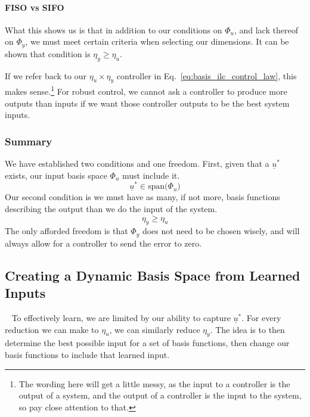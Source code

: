 \FloatBarrier\paragraph{FISO vs SIFO}
What this shows us is that in addition to our conditions on $\Phi_u$, and lack thereof on $\Phi_y$, we must meet certain criteria when selecting our dimensions. It can be shown that condition is $\eta_y \geq \eta_u$.

If we refer back to our $\eta_u \times \eta_y$ controller in Eq.~\ref{eq:basis_ilc_control_law}, this makes sense.\footnote{The wording here will get a little messy, as the input to a controller is the output of a system, and the output of a controller is the input to the system, so pay close attention to that.} For robust control, we cannot ask a controller to produce more outputs than inputs if we want those controller outputs to be the best system inputs. 

\FloatBarrier\subsubsection{Summary}
We have established two conditions and one freedom. First, given that a $\underline{u}^\ast$ exists, our input basis space $\Phi_u$ must include it.
\begin{equation}
    \underline{u}^\ast \in \text{span($\Phi_u$)}
    \label{eq:basis_ilc_u_star_condition}
\end{equation}
Our second condition is we must have as many, if not more, basis functions describing the output than we do the input of the system.
\begin{equation}
    \eta_y \geq \eta_u
    \label{eq:basis_ilc_num_basis_condition}
\end{equation}
The only afforded freedom is that $\Phi_y$ does not need to be chosen wisely, and will always allow for a controller to send the error to zero.

\FloatBarrier\subsection{Creating a Dynamic Basis Space from Learned Inputs}
~\label{sub:dynamic_arb_basis}
To effectively learn, we are limited by our ability to capture $\underline{u}^\ast$. For every reduction we can make to $\eta_u$, we can similarly reduce $\eta_y$. The idea is to then determine the best possible input for a set of basis functions, then change our basis functions to include that learned input. 

